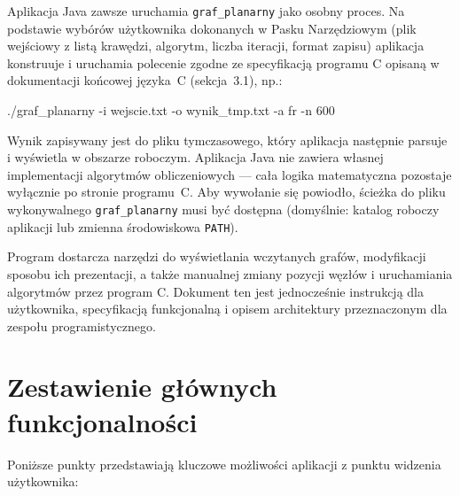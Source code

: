 \documentclass[a4paper, 11pt]{article}
\begin{document}
Aplikacja Java zawsze uruchamia \texttt{graf\_planarny} jako osobny proces. Na podstawie wyb\'or\'ow u\.zytkownika dokonanych w Pasku Narz\k{e}dziowym (plik wej\'sciowy z list\k{a} kraw\k{e}dzi, algorytm, liczba iteracji, format zapisu) aplikacja konstruuje i uruchamia polecenie zgodne ze specyfikacj\k{a} programu C opisan\k{a} w dokumentacji ko\'ncowej j\k{e}zyka~C (sekcja~3.1), np.:

\begin{cmdbox}
./graf\_planarny -i wejscie.txt -o wynik\_tmp.txt -a fr -n 600
\end{cmdbox}

Wynik zapisywany jest do pliku tymczasowego, kt\'ory aplikacja nast\k{e}pnie parsuje i wy\'swietla w obszarze roboczym. Aplikacja Java nie zawiera w\l{}asnej implementacji algorytm\'ow obliczeniowych --- ca\l{}a logika matematyczna pozostaje wy\l{}\k{a}cznie po stronie programu~C. Aby wywo\l{}anie si\k{e} powiod\l{}o, \'scie\.zka do pliku wykonywalnego \texttt{graf\_planarny} musi by\'c dost\k{e}pna (domy\'slnie: katalog roboczy aplikacji lub zmienna \'srodowiskowa \texttt{PATH}).

Program dostarcza narz\k{e}dzi do wy\'swietlania wczytanych graf\'ow, modyfikacji sposobu ich prezentacji, a tak\.ze manualnej zmiany pozycji w\k{e}z\l{}\'ow i uruchamiania algorytm\'ow przez program C. Dokument ten jest jednocze\'snie instrukcj\k{a} dla u\.zytkownika, specyfikacj\k{a} funkcjonaln\k{a} i opisem architektury przeznaczonym dla zespo\l{}u programistycznego.

\section{Zestawienie g\l{}ównych funkcjonalno\'sci}

Poni\.zsze punkty przedstawiaj\k{a} kluczowe mo\.zliwo\'sci aplikacji z punktu widzenia u\.zytkownika:
\end{document}
